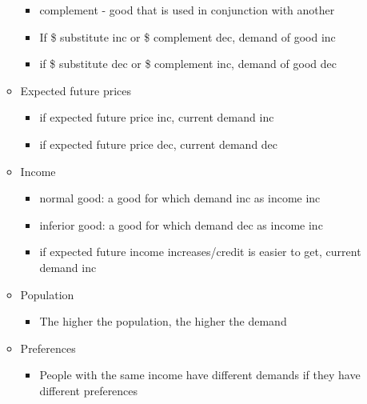 \documentclass[11pt]{article}
\begin{document}
\begin{itemize}
\begin{itemize}
\begin{itemize}
\item complement - good that is used in conjunction with another
\item If \$ substitute inc or \$ complement dec, demand of good inc
\item if \$ substitute dec or \$ complement inc, demand of good dec
\end{itemize}
\item Expected future prices
\begin{itemize}
\item if expected future price inc, current demand inc
\item if expected future price dec, current demand dec
\end{itemize}
\item Income
\begin{itemize}
\item normal good: a good for which demand inc as income inc
\item inferior good: a good for which demand dec as income inc
\item if expected future income increases/credit is easier to get, current demand inc
\end{itemize}
\item Population
\begin{itemize}
\item The higher the population, the higher the demand
\end{itemize}
\item Preferences
\begin{itemize}
\item People with the same income have different demands if they have different preferences
\end{itemize}
\end{itemize}
\end{itemize}
\end{document}

